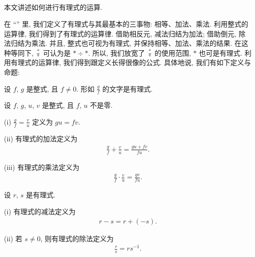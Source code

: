\subsection*{\OperationsOnRationalExprsssions}
\markright{\OperationsOnRationalExprsssions}

本文讲述如何进行有理式的运算.

在 ``\DefinitionOfRationalExpressions'' 里, 我们定义了有理式与其最基本的三事物: 相等、加法、乘法. 利用整式的运算律, 我们得到了有理式的运算律. 借助相反元, 减法归结为加法; 借助倒元, 除法归结为乘法. 并且, 整式也可视为有理式, 并保持相等、加法、乘法的结果. 在这种等同下, $\frac{\ast}{\ast}$ 可认为是 $\ast \div \ast$. 所以, 我们放宽了 $\frac{\ast}{\ast}$ 的使用范围, $\ast$ 也可是有理式. 利用有理式的运算律, 我们得到跟定义长得很像的公式. 具体地说, 我们有如下定义与命题:

\begin{definition}
    设 $f$, $g$ 是整式, 且 $f \neq 0$. 形如 $\frac{g}{f}$ 的文字是有理式.
\end{definition}

\begin{definition}
    设 $f$, $g$, $u$, $v$ 是整式, 且 $f$, $u$ 不是零.

    (i) $\frac{g}{f} = \frac{v}{u}$ 定义为 $gu = fv$.

    (ii) 有理式的加法定义为
    \begin{align*}
        \frac{g}{f} + \frac{v}{u} = \frac{gu + fv}{fu}.
    \end{align*}

    (iii) 有理式的乘法定义为
    \begin{align*}
        \frac{g}{f} \cdot \frac{v}{u} = \frac{gv}{fu}.
    \end{align*}
\end{definition}

\begin{definition}
    设 $r$, $s$ 是有理式.

    (i) 有理式的减法定义为
    \begin{align*}
        r - s = r + (-s).
    \end{align*}

    (ii) 若 $s \neq 0$, 则有理式的除法定义为
    \begin{align*}
        \frac{r}{s} = rs^{-1}.
    \end{align*}
\end{definition}

